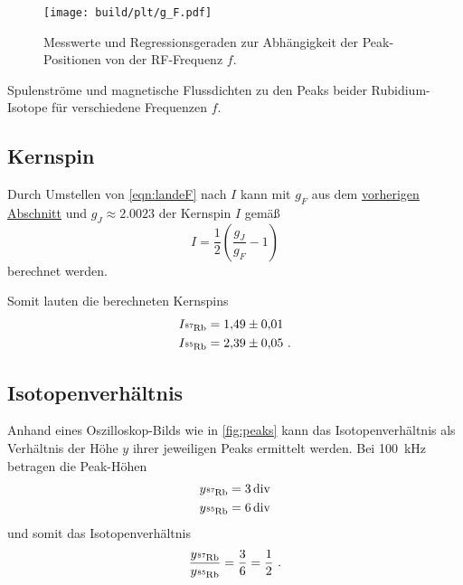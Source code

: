 \begin{figure}
    \centering
    \texttt{[image: build/plt/g\_F.pdf]}
    \caption{Messwerte und Regressionsgeraden zur Abhängigkeit der Peak-Positionen von der RF-Frequenz $f$.}
    \label{fig:plt:g_F}
\end{figure}

\begin{table}
    \centering
    \caption{Spulenströme und magnetische Flussdichten zu den Peaks beider Rubidium-Isotope für verschiedene Frequenzen $f$.}
    \label{tab:mess}
\end{table}


\subsection{Kernspin}
Durch Umstellen von \autoref{eqn:landeF} nach $I$ kann
mit $g_F$ aus dem \hyperref[sec:auswertung:g_F]{vorherigen Abschnitt}
und $g_J \approx \num{2.0023}$
der Kernspin $I$ gemäß
\begin{equation*}
    I = \frac{1}{2} \left( \frac{g_J}{g_F} - 1 \right)
\end{equation*}
berechnet werden.

Somit lauten die berechneten Kernspins
\begin{align*}
    I_{\Rb{87}} &= \num{1.49 \pm 0.01} \\
    I_{\Rb{85}} &= \num{2.39 \pm 0.05} \ .
\end{align*}


\subsection{Isotopenverhältnis}
Anhand eines Oszilloskop-Bilds wie in \autoref{fig:peaks} kann das Isotopenverhältnis
als Verhältnis der Höhe $y$ ihrer jeweiligen Peaks ermittelt werden.
Bei \SI{100}{\kilo\hertz} betragen die Peak-Höhen
\begin{align*}
    y_{\Rb{87}} &= \SI{3}{{div}} \\ %
    y_{\Rb{85}} &= \SI{6}{{div}} \\ %
\end{align*}
und somit das Isotopenverhältnis
\[
    \frac{y_{\Rb{87}}}{y_{\Rb{85}}}
    = \frac{3}{6}
    = \frac{1}{2} \ .
\]


